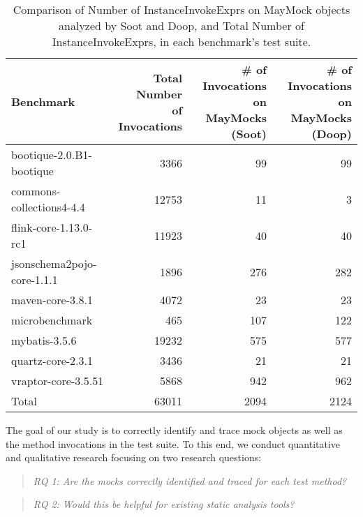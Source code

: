 \begin{table*}[b]
	\centering
	\caption{Comparison of Number of InstanceInvokeExprs on MayMock objects analyzed by Soot and Doop, and Total Number of InstanceInvokeExprs, in each benchmark's test suite.}
	\begin{tabular}{lrrr}
		\toprule
		Benchmark & \thead{Total Number \\ of Invocations} & \thead{\# of Invocations \\ on MayMocks (Soot)} & \thead{\# of Invocations \\ on MayMocks (Doop)} \\
		\midrule
		bootique-2.0.B1-bootique           		&  3366     &  99  & 99  \\
		commons-collections4-4.4       			&  12753    &  11  & 3  \\
		flink-core-1.13.0-rc1           		&  11923    &  40  & 40  \\
		jsonschema2pojo-core-1.1.1           	&  1896     &  276  & 282  \\
		maven-core-3.8.1           				&  4072     &  23   & 23  \\
		microbenchmark         		  			&  465      &  107  & 122      \\
		mybatis-3.5.6         		  			&  19232    &  575  & 577       \\
		quartz-core-2.3.1       	  			&  3436     &  21   & 21    \\
		vraptor-core-3.5.51        	  			&  5868     &  942  & 962    \\
		\bottomrule
		Total        	  						&  63011    & 2094  & 2124    \\
	\end{tabular}
	\label{tab:invokes}
\end{table*}

The goal of our study is to correctly identify and trace mock objects as well as the method invocations in the test suite. To this end, we conduct quantitative and qualitative research focusing on two research questions:

\begin{quote}
	\emph{RQ 1: Are the mocks correctly identified and traced for each test method?}
\end{quote}

\begin{quote}
	\emph{RQ 2: Would this be helpful for existing static analysis tools?}
\end{quote}

